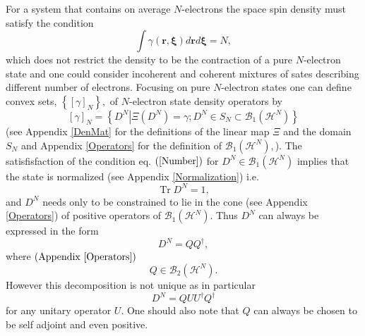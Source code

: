 \documentclass[aps,preprint]{revtex4}%
\begin{document}
For a system that contains on average $N$-electrons the space spin density
must satisfy the condition
\begin{equation}
\int\gamma\left(  \mathbf{r,\xi}\right)  d\mathbf{r}d\mathbf{\xi
}=N,\label{Number}%
\end{equation}
which does not restrict the density to be the contraction of a pure
$N$-electron state and one could consider incoherent and coherent mixtures of
sates describing different number of electrons. Focusing on pure $N$-electron
states one can define convex sets, $\left\{  \left[  \gamma\right]
_{N}\right\}  ,$ of $N$-electron state density operators by
\begin{equation}
\left[  \gamma\right]  _{N}=\left\{  \left.  D^{N}\right\vert \Xi\left(
D^{N}\right)  =\gamma;D^{N}\in S_{N}\subset\mathcal{B}_{1}\left(
\mathcal{H}^{N}\right)  \right\}
\end{equation}
(see Appendix \ref{DenMat} for the definitions of the linear map $\Xi$ and the
domain $S_{N}$ and Appendix \ref{Operators} for the definition of
$\mathcal{B}_{1}\left(  \mathcal{H}^{N}\right)  ,$). The satisfisfaction of
the condition eq. $\left(  \ref{Number}\right)  $ for $D^{N}\in\mathcal{B}%
_{1}\left(  \mathcal{H}^{N}\right)  $ implies that the state is normalized
(see Appendix \ref{Normalization}) i.e.
\begin{equation}
\operatorname{Tr}D^{N}=1,
\end{equation}
and $D^{N}$ needs only to be constrained to lie in the cone (see Appendix
\ref{Operators}) of positive operators of $\mathcal{B}_{1}\left(
\mathcal{H}^{N}\right)  $. Thus $D^{N}$ can always be expressed in the form
\begin{equation}
D^{N}=QQ^{\dagger},
\end{equation}
where $\left(  \text{Appendix \ref{Operators}}\right)  $
\begin{equation}
Q\in\mathcal{B}_{2}\left(  \mathcal{H}^{N}\right)  .
\end{equation}
However this decomposition is not unique as in particular
\begin{equation}
D^{N}=QUU^{\dagger}Q^{\dagger}%
\end{equation}
for any unitary operator $U$. One should also note that $Q$ can always be
chosen to be self adjoint and even positive.
\end{document}
